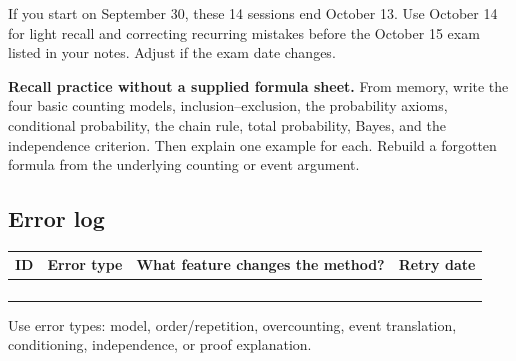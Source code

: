 \documentclass[11pt]{article}
\begin{document}
If you start on September 30, these 14 sessions end October 13. Use October 14 for light recall and correcting recurring mistakes before the October 15 exam listed in your notes. Adjust if the exam date changes.

\textbf{Recall practice without a supplied formula sheet.} From memory, write the four basic counting models, inclusion--exclusion, the probability axioms, conditional probability, the chain rule, total probability, Bayes, and the independence criterion. Then explain one example for each. Rebuild a forgotten formula from the underlying counting or event argument.

\subsection*{Error log}
\begin{tabular}{p{0.65in}p{1.25in}p{2.65in}p{1.3in}}
\toprule ID & Error type & What feature changes the method? & Retry date\\\midrule
\rule{0pt}{0.4in} & & &\\
\rule{0pt}{0.4in} & & &\\
\rule{0pt}{0.4in} & & &\\
\rule{0pt}{0.4in} & & &\\\bottomrule
\end{tabular}
Use error types: model, order/repetition, overcounting, event translation, conditioning, independence, or proof explanation.
\end{document}
